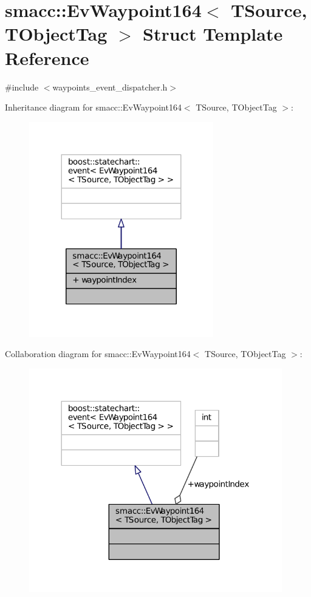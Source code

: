 \hypertarget{structsmacc_1_1EvWaypoint164}{}\section{smacc\+:\+:Ev\+Waypoint164$<$ T\+Source, T\+Object\+Tag $>$ Struct Template Reference}
\label{structsmacc_1_1EvWaypoint164}


{\ttfamily \#include $<$waypoints\+\_\+event\+\_\+dispatcher.\+h$>$}



Inheritance diagram for smacc\+:\+:Ev\+Waypoint164$<$ T\+Source, T\+Object\+Tag $>$\+:
\nopagebreak
\begin{figure}[H]
\begin{center}
\leavevmode
\includegraphics[width=227pt]{structsmacc_1_1EvWaypoint164__inherit__graph}
\end{center}
\end{figure}


Collaboration diagram for smacc\+:\+:Ev\+Waypoint164$<$ T\+Source, T\+Object\+Tag $>$\+:
\nopagebreak
\begin{figure}[H]
\begin{center}
\leavevmode
\includegraphics[width=312pt]{structsmacc_1_1EvWaypoint164__coll__graph}
\end{center}
\end{figure}
